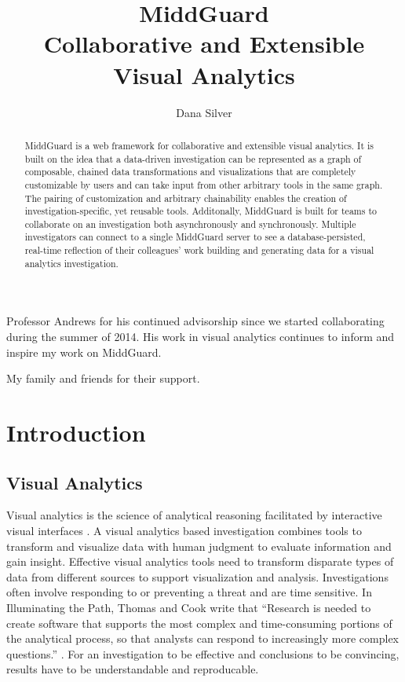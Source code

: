 \documentclass[midd]{thesis}
\title {MiddGuard\\Collaborative and Extensible\\Visual Analytics}
\author {Dana Silver}
\begin{document}
\maketitle


\begin{abstract}

MiddGuard is a web framework for collaborative and extensible visual analytics.
It is built on the idea that a data-driven investigation can be represented as a
graph of composable, chained data transformations and visualizations that are
completely customizable by users and can take input from other arbitrary tools
in the same graph. The pairing of customization and arbitrary chainability
enables the creation of investigation-specific, yet reusable tools. Additonally,
MiddGuard is built for teams to collaborate on an investigation both
asynchronously and synchronously. Multiple investigators can connect to a single
MiddGuard server to see a database-persisted, real-time reflection of their
colleagues' work building and generating data for a visual analytics
investigation.

\end{abstract}

\begin{acknowledgements}

Professor Andrews for his continued advisorship since we started collaborating
during the summer of 2014. His work in visual analytics continues to inform and
inspire my work on MiddGuard.

My family and friends for their support.

\end{acknowledgements}

\contentspage
\figurelistpage

\normalspacing \setcounter{page}{1} 

\chapter{Introduction}

\section{Visual Analytics}

Visual analytics is the science of analytical reasoning facilitated by
interactive visual interfaces \cite{illuminate}. A visual analytics based
investigation combines tools to transform and visualize data with
human judgment to evaluate information and gain insight. Effective visual
analytics tools need to transform disparate types of data from different sources
to support visualization and analysis. Investigations often involve responding
to or preventing a threat and are time sensitive. In Illuminating the Path,
Thomas and Cook write that ``Research is needed to create software that supports
the most complex and time-consuming portions of the analytical process, so that
analysts can respond to increasingly more complex questions.''
\cite{illuminate}. For an investigation to be effective and conclusions to be
convincing, results have to be understandable and reproducable.
\end{document}
